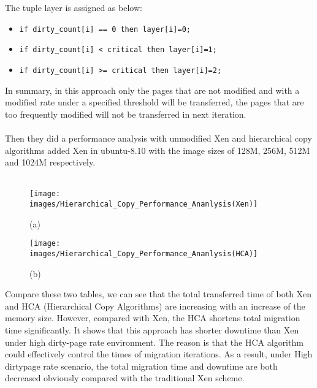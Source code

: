 \documentclass[runningheads]{llncs}
\begin{document}
The tuple layer is assigned as below:
\begin{itemize}
\item 
\lstset{language=sh, basicstyle=\footnotesize}
\begin{lstlisting}
if dirty_count[i] == 0 then layer[i]=0;
\end{lstlisting}
\item
\begin{lstlisting}
if dirty_count[i] < critical then layer[i]=1;
\end{lstlisting}
\item
\begin{lstlisting}
if dirty_count[i] >= critical then layer[i]=2;
\end{lstlisting}
\end{itemize}
In summary, in this approach only the pages that are not modified and with a modified rate under a specified threshold will be transferred, the pages that are too frequently modified will not be transferred in next iteration.
\\\\
Then they did a performance analysis with unmodified Xen and hierarchical copy algorithms added Xen in ubuntu-8.10 with the image sizes of 128M, 256M, 512M and 1024M respectively.
\\\\

\begin{figure}
\centering
\texttt{[image: images/Hierarchical\_Copy\_Performance\_Ananlysis(Xen)]}
\caption{(a)}
\end{figure}

\begin{figure}
\centering
\texttt{[image: images/Hierarchical\_Copy\_Performance\_Ananlysis(HCA)]}
\caption{(b)}
\end{figure}

Compare these two tables, we can see that the total transferred time of both Xen and HCA (Hierarchical Copy Algorithms) are increasing with an increase of the memory size. However, compared with Xen, the HCA shortens total migration time significantly. It shows that this approach has shorter downtime than Xen under high dirty-page rate environment. The reason is that the HCA algorithm could effectively control the times of migration iterations. As a result, under High dirtypage rate scenario, the total migration time and downtime are both decreased obviously compared with the traditional Xen scheme\cite{liu2010hierarchical}.
\end{document}
